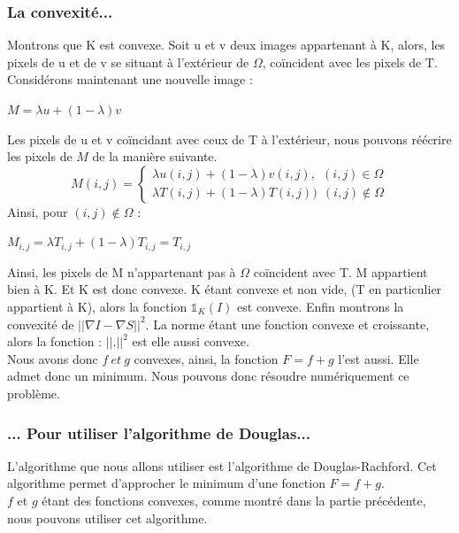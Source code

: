 \subsubsection{La convexité...}
Montrons que K est convexe. 
Soit u et v deux images appartenant à K, alors, les pixels de u et de v se situant à l'extérieur de $\Omega$, coïncident avec les pixels de T. \\
Considérons maintenant une nouvelle image : 
\begin{center}
$M = \lambda u+(1-\lambda)v$
\end{center}
Les pixels de u et v coïncidant avec ceux de T à l'extérieur, nous pouvons réécrire les pixels de $M$ de la manière suivante. \\

\begin{equation*} 
M (i,j) = 
\left\{
\begin{aligned}
\lambda u(i,j) +(1-\lambda) v(i,j), \ \ (i,j) \in \Omega\\
\lambda T(i,j) +(1-\lambda )T(i,j))  \ \ (i,j)\notin \Omega
\end{aligned}
\right.
\end{equation*}
Ainsi, pour $(i,j) \notin \Omega$ : \\
\begin{center}
$M_{i,j} = \lambda T_{i,j}+(1-\lambda) T_{i,j} = T_{i,j}$
\end{center}
Ainsi, les pixels de M n'appartenant pas à $\Omega$ coïncident avec T. M appartient bien à K. Et K est donc convexe.\newline
K étant convexe et non vide, (T en particulier appartient à K), alors la fonction $\mathbb{1}_K(I)$ est convexe. \newline
Enfin montrons la convexité de $||\nabla I-\nabla S||^2$.\newline
La norme étant une fonction convexe et croissante, alors la fonction : $||.||^2$ est elle aussi convexe. \\
Nous avons donc $f\ et\ g$ convexes, ainsi, la fonction $F =f+g$ l'est aussi. Elle admet donc un minimum. Nous pouvons donc résoudre numériquement ce problème.
\subsubsection{... Pour utiliser l'algorithme de Douglas...}
L'algorithme que nous allons utiliser est l'algorithme de Douglas-Rachford. Cet algorithme permet d'approcher le minimum d'une fonction $F = f+g$. \\
 $f$ et $g$ étant des fonctions convexes, comme montré dans la partie précédente, nous pouvons utiliser cet algorithme.
